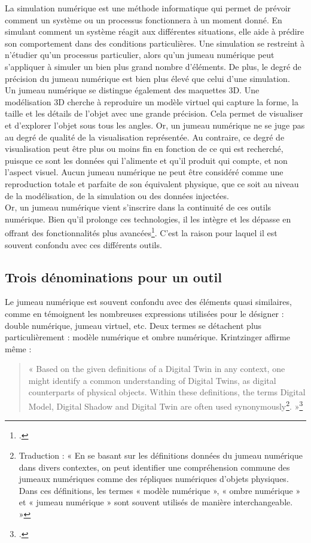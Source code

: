 La simulation numérique est une méthode informatique qui permet de prévoir comment un système ou un processus fonctionnera à un moment donné. En simulant comment un système réagit aux différentes situations, elle aide à prédire son comportement dans des conditions particulières. Une simulation se restreint à n’étudier qu’un processus particulier, alors qu’un jumeau numérique peut s’appliquer à simuler un bien plus grand nombre d’éléments. De plus, le degré de précision du jumeau numérique est bien plus élevé que celui d’une simulation.\\

Un jumeau numérique se distingue également des maquettes 3D. Une modélisation 3D cherche à reproduire un modèle virtuel qui capture la forme, la taille et les détails de l'objet avec une grande précision. Cela permet de visualiser et d'explorer l'objet sous tous les angles. Or, un jumeau numérique ne se juge pas au degré de qualité de la visualisation représentée. Au contraire, ce degré de visualisation peut être plus ou moins fin en fonction de ce qui est recherché, puisque ce sont les données qui l’alimente et qu’il produit qui compte, et non l’aspect visuel. Aucun jumeau numérique ne peut être considéré comme une reproduction totale et parfaite de son équivalent physique, que ce soit au niveau de la modélisation, de la simulation ou des données injectées.\\

Or, un jumeau numérique vient s’inscrire dans la continuité de ces outils numérique. Bien qu’il prolonge ces technologies, il les intègre et les dépasse en offrant des fonctionnalités plus avancées\footcite{bealJumeauNumeriqueRealite}. C'est la raison pour laquel il est souvent confondu avec ces différents outils.

        \subsection{Trois dénominations pour un outil}

Le jumeau numérique est souvent confondu avec des éléments quasi similaires, comme en témoignent les nombreuses expressions utilisées pour le désigner : double numérique, jumeau virtuel, etc. Deux termes se détachent plus particulièrement : modèle numérique et ombre numérique. Krintzinger affirme même :  

\begin{quote}
    « Based on the given definitions of a Digital Twin in any context, one might identify a common understanding of Digital Twins, as digital counterparts of physical objects. Within these definitions, the terms Digital Model, Digital Shadow and Digital Twin are often used synonymously\footnote{Traduction : « En se basant sur les définitions données du jumeau numérique dans divers contextes, on peut identifier une compréhension commune des jumeaux numériques comme des répliques numériques d'objets physiques. Dans ces définitions, les termes « modèle numérique », « ombre numérique » et « jumeau numérique » sont souvent utilisés de manière interchangeable. »}. »\footcite{kritzingerDigitalTwinManufacturing2018}
\end{quote}

